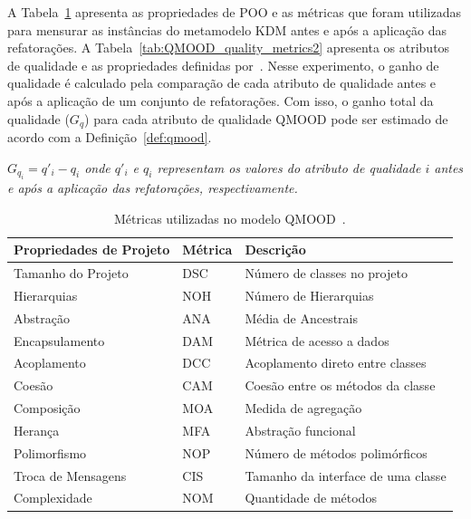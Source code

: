A Tabela~\ref{tab:QMOOD_quality_metrics} apresenta as propriedades de POO e as métricas que foram utilizadas para mensurar as instâncias do metamodelo KDM antes e após a aplicação das refatorações. A Tabela~\ref{tab:QMOOD_quality_metrics2} apresenta os atributos de qualidade e as propriedades definidas por~. Nesse experimento, o ganho de qualidade é calculado pela comparação de cada atributo de qualidade antes e após a aplicação de um conjunto de refatorações. Com isso, o ganho total da qualidade ($G_{q}$) para cada atributo de qualidade QMOOD pode ser estimado de acordo com a Definição~\ref{def:qmood}.

\begin{definicao}\label{def:qmood}
    \textit{$G_{q_{i}} = q'_{i} - q_{i}$ onde $q'_{i}$ e $q_{i}$ representam os valores do atributo de qualidade $i$ antes e após a aplicação das refatorações, respectivamente.}
\end{definicao}

\begin{table}[!h]
\caption{Métricas utilizadas no modelo QMOOD~\cite{Bansiya_QMOOD}.}
\label{tab:QMOOD_quality_metrics}
\begin{center}
\begin{tabular}{ | m{4.2cm} | m{1.4cm}| m{6cm} | } 
\hline
Propriedades de Projeto & Métrica & Descrição \\ 
\hline
Tamanho do Projeto & DSC & Número de classes no projeto \\ 
\hline
Hierarquias & NOH & Número de Hierarquias \\ 
\hline
Abstração & ANA & Média de Ancestrais \\ 
\hline
Encapsulamento & DAM & Métrica de acesso a dados \\ 
\hline
Acoplamento & DCC & Acoplamento direto entre classes \\ 
\hline
Coesão & CAM & Coesão entre os métodos da classe \\ 
\hline
Composição & MOA & Medida de agregação \\ 
\hline
Herança & MFA & Abstração funcional \\ 
\hline
Polimorfismo & NOP & Número de métodos polimórficos \\ 
\hline
Troca de Mensagens & CIS & Tamanho da interface de uma classe \\ 
\hline
Complexidade & NOM & Quantidade de métodos \\ 
\hline
\end{tabular}
\end{center}
\end{table}

